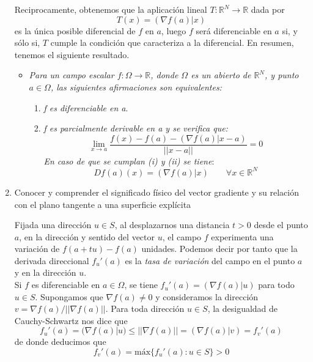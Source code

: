 \documentclass[a4paper, 12pt]{article}
\begin{document}
\begin{enumerate}[label=\textbf{\arabic*}.]
Reciprocamente, obtenemos que la aplicación lineal \(T: \mathbb{R}^N \to \mathbb{R}\) dada por
\[
	T(x) = (\nabla f(a) | x)
\]
es la única posible diferencial de \(f\) en \(a\), luego \(f\) será diferenciable en \(a\) si, y sólo si, \(T\) cumple la condición que caracteriza a la diferencial. En resumen, tenemos el siguiente resultado.
\begin{itemize}
	\item \textit{Para un campo escalar \(f: \Omega \to \mathbb{R}\), donde \(\Omega\) es un abierto de \(\mathbb{R}^N\), y punto \(a \in \Omega\), las siguientes afirmaciones son equivalentes:}
	\begin{enumerate}[label=(\textit{\roman*})]
		\item \textit{f es diferenciable en a}.
		\item \textit{f es parcialmente derivable en a y se verifica que:}
		\begin{equation} \label{diferenciable_1}
			\lim_{x \to a} \frac{f(x) - f(a) - (\nabla f(a) | x-a)}{||x-a||} = 0
		\end{equation}
		\textit{En caso de que se cumplan (i) y (ii) se tiene}:
		\begin{equation}\label{diferenciable_2}
			Df(a)(x) = (\nabla f(a) | x) \qquad \forall x \in \mathbb{R}^N
		\end{equation}
	\end{enumerate}
\end{itemize}

\bigskip

\item Conocer y comprender el significado físico del vector gradiente y su relación con el plano tangente a una superficie explícita

Fijada una dirección \(u \in S\), al desplazarnos una distancia \(t > 0\) desde el punto \(a\), en la dirección y sentido del vector \(u\), el campo \(f\) experimenta una variación de \(f (a +tu) - f(a)\) unidades. Podemos decir por tanto que la derivada direccional \(f_u'(a)\) es la \textit{tasa de variación} del campo en el punto \(a\) y en la dirección \(u\).  \\

Si \(f\) es diferenciable en \(a \in \Omega\), se tiene \(f_u'(a) = (\nabla f(a) | u)\) para todo \(u \in S\). Supongamos que \(\nabla f(a) \neq 0\) y consideramos la dirección \(v = \nabla f(a) / || \nabla f(a)||\). Para toda dirección \(u \in S\), la desigualdad de Cauchy-Schwartz nos dice que
\[
	f_u'(a) = (\nabla f(a) |u) \leq || \nabla f(a)|| = (\nabla f(a) | v) = f_v'(a)
\]
de donde deducimos que
\[
	f_v'(a) = \text{máx} \{ f_u'(a) : u \in S\} > 0
\]


\end{enumerate}
\end{document}
